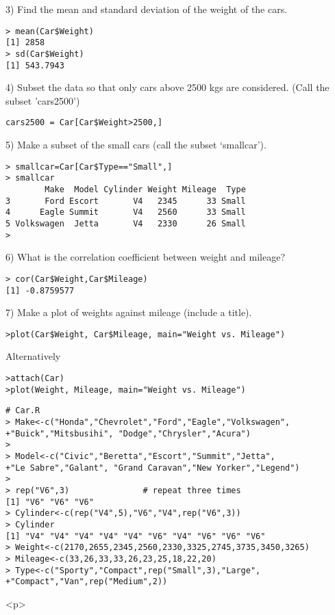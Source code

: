 3) Find the mean and standard deviation of the weight of the cars.
\begin{verbatim}
> mean(Car$Weight)
[1] 2858
> sd(Car$Weight)
[1] 543.7943
\end{verbatim}

4) Subset the data so that only cars above 2500 kgs are considered. (Call the subset 'cars2500')
\begin{verbatim}
cars2500 = Car[Car$Weight>2500,]
\end{verbatim}

5) Make a subset of the small cars (call the subset `smallcar').
\begin{verbatim}
> smallcar=Car[Car$Type=="Small",]
> smallcar
        Make  Model Cylinder Weight Mileage  Type
3       Ford Escort       V4   2345      33 Small
4      Eagle Summit       V4   2560      33 Small
5 Volkswagen  Jetta       V4   2330      26 Small
>
\end{verbatim}

6) What is the correlation coefficient between weight and mileage?

\begin{verbatim}
> cor(Car$Weight,Car$Mileage)
[1] -0.8759577
\end{verbatim}

7) Make a plot of weights against mileage (include a title).

\begin{verbatim}
>plot(Car$Weight, Car$Mileage, main="Weight vs. Mileage")
\end{verbatim}

Alternatively
\begin{verbatim}
>attach(Car)
>plot(Weight, Mileage, main="Weight vs. Mileage")
\end{verbatim}

\newpage


\newpage

\begin{verbatim}
# Car.R
> Make<-c("Honda","Chevrolet","Ford","Eagle","Volkswagen",
+"Buick","Mitsbusihi", "Dodge","Chrysler","Acura")
>
> Model<-c("Civic","Beretta","Escort","Summit","Jetta",
+"Le Sabre","Galant", "Grand Caravan","New Yorker","Legend")
>
> rep("V6",3)               # repeat three times
[1] "V6" "V6" "V6"
> Cylinder<-c(rep("V4",5),"V6","V4",rep("V6",3))
> Cylinder
[1] "V4" "V4" "V4" "V4" "V4" "V6" "V4" "V6" "V6" "V6"
> Weight<-c(2170,2655,2345,2560,2330,3325,2745,3735,3450,3265)
> Mileage<-c(33,26,33,33,26,23,25,18,22,20)
> Type<-c("Sporty","Compact",rep("Small",3),"Large",
+"Compact","Van",rep("Medium",2))
\end{verbatim}

<p>
